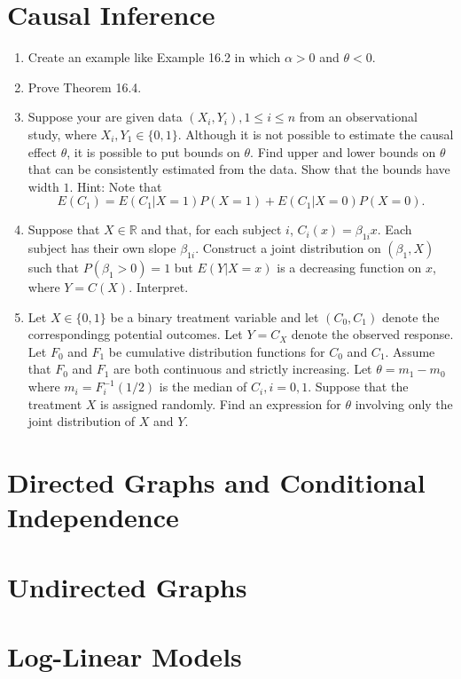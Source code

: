 \documentclass{article}
\begin{document}
\section{Causal Inference}
\begin{enumerate}
	\item Create an example like Example 16.2 in which $\alpha > 0$ and $\theta < 0$.
	\item Prove Theorem 16.4.
	\item Suppose your are given data $(X_i, Y_i), 1 \leq i \leq n$ from an observational study, where $X_i, Y_1 \in \{0, 1\}$. Although it is not possible to estimate the causal effect $\theta$, it is possible to put bounds on $\theta$. Find upper and lower bounds on $\theta$ that can be consistently estimated from the data. Show that the bounds have width $1$.
	Hint: Note that
	$$
	E(C_1) = E(C_1|X = 1)P(X = 1) + E(C_1|X = 0)P(X = 0).
	$$
	\item Suppose that $X \in \mathbb{R}$ and that, for each subject $i$, $C_i(x) = \beta_{1i}x$. Each subject has their own slope $\beta_{1i}$. Construct a joint distribution on $(\beta_1, X)$ such that $P(\beta_1 > 0) = 1$ but $E(Y|X = x)$ is a decreasing function on $x$, where  $Y = C(X)$. Interpret.
	\item Let $X \in \{0, 1\}$ be a binary treatment variable and let $(C_0, C_1)$ denote the correspondingg potential outcomes. Let $Y = C_X$ denote the observed response. Let $F_0$ and $F_1$ be cumulative distribution functions for $C_0$ and $C_1$. Assume that $F_0$ and $F_1$ are both continuous and strictly increasing. Let $\theta = m_1 - m_0$ where $m_i = F_i^{-1}(1 / 2)$ is the median of $C_i, i = 0, 1$. Suppose that the treatment $X$ is assigned randomly. Find an expression for $\theta$ involving only the joint distribution of $X$ and $Y$.
\end{enumerate}

\section{Directed Graphs and Conditional Independence}

\section{Undirected Graphs}

\section{Log-Linear Models}
\end{document}

